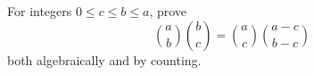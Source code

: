 For integers $0\le c\le b\le a$, prove
\[\binom ab\binom bc=\binom ac\binom{a-c}{b-c}\]
both algebraically and by counting.
